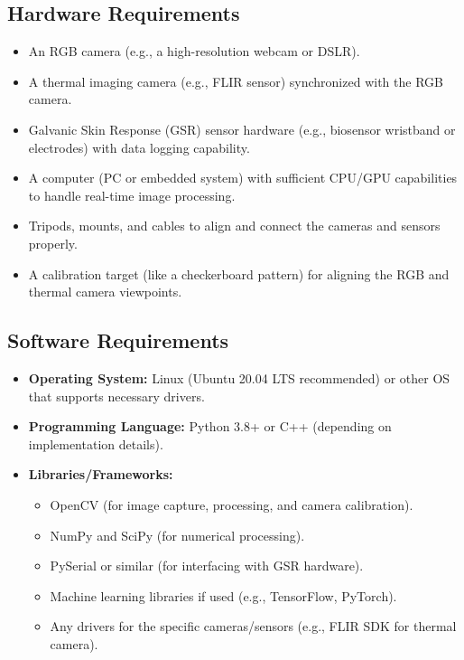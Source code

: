 \documentclass{article}
\begin{document}
    \subsection{Hardware Requirements}

    \begin{itemize}
        \item An RGB camera (e.g., a high-resolution webcam or DSLR).
        \item A thermal imaging camera (e.g., FLIR sensor) synchronized with the RGB camera.
        \item Galvanic Skin Response (GSR) sensor hardware (e.g., biosensor wristband or electrodes) with data logging capability.
        \item A computer (PC or embedded system) with sufficient CPU/GPU capabilities to handle real-time image processing.
        \item Tripods, mounts, and cables to align and connect the cameras and sensors properly.
        \item A calibration target (like a checkerboard pattern) for aligning the RGB and thermal camera viewpoints.
    \end{itemize}

    \subsection{Software Requirements}

    \begin{itemize}
        \item \textbf{Operating System:} Linux (Ubuntu 20.04 LTS recommended) or other OS that supports necessary drivers.
        \item \textbf{Programming Language:} Python 3.8+ or C++ (depending on implementation details).
        \item \textbf{Libraries/Frameworks:}
        \begin{itemize}
            \item OpenCV (for image capture, processing, and camera calibration).
            \item NumPy and SciPy (for numerical processing).
            \item PySerial or similar (for interfacing with GSR hardware).
            \item Machine learning libraries if used (e.g., TensorFlow, PyTorch).
            \item Any drivers for the specific cameras/sensors (e.g., FLIR SDK for thermal camera).
        \end{itemize}
    \end{itemize}
\end{document}
